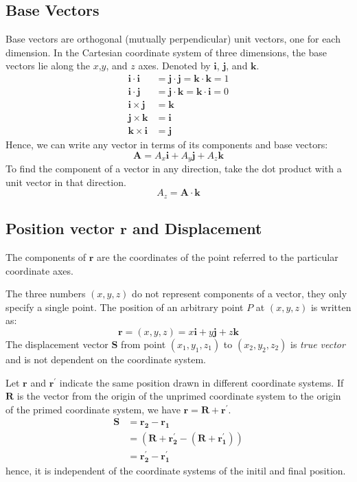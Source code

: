\documentclass{article}
\begin{document}
{\subsection{Base Vectors}
Base vectors are orthogonal (mutually perpendicular) unit vectors, one for each
dimension. In the Cartesian coordinate system of three dimensions, the base
vectors lie along the $x$,$y$, and $z$ axes. Denoted by $\textbf{i}$,
$\textbf{j}$, and $\textbf{k}$.
\begin{align*}
    \mathbf{i} \cdot \mathbf{i} &= \mathbf{j} \cdot \mathbf{j} = \mathbf{k} \cdot \mathbf{k} = 1 \\
    \mathbf{i} \cdot  \mathbf{j} &=  \mathbf{j} \cdot  \mathbf{k} =  \mathbf{k} \cdot  \mathbf{i} = 0 \\
    \mathbf{i} \times  \mathbf{j} &=  \mathbf{k} \\
    \mathbf{j} \times  \mathbf{k} &=  \mathbf{i} \\
    \mathbf{k} \times  \mathbf{i} &=  \mathbf{j}
\end{align*}
Hence, we can write any vector in terms of its components and base vectors:
\[ \mathbf{A} = A_x \mathbf{i}+A_y \mathbf{j}+A_z \mathbf{k}\]
To find the component of a vector in any direction, take the dot product
with a unit vector in that direction.
\[A_z = \mathbf{A} \cdot \mathbf{k}\]
\subsection{Position vector $\mathbf{r}$ and Displacement }
The components of $\mathbf{r}$ are the coordinates of the
point referred to the particular coordinate axes.

The three numbers $(x,y,z)$ do not represent components of a vector, they only
specify a single point. The position of an arbitrary point $P$ at $(x,y,z)$ is
written as:
\[\mathbf{r} = (x,y,z) = x\mathbf{i}+y\mathbf{j}+z\mathbf{k}\] The displacement
vector $\mathbf{S}$ from point $(x_1,y_1,z_1)$ to $(x_2,y_2,z_2)$ is \emph{true
vector} and is not dependent on the coordinate system.

Let $\mathbf{r}$ and $\mathbf{r^{\prime}}$ indicate the same position drawn in
different coordinate systems. If $\mathbf{R}$ is the vector from the origin of
the unprimed coordinate system to the origin of the primed coordinate system, we
have $\mathbf{r} = \mathbf{R}+\mathbf{r^{\prime}}$. 
\begin{align*}
    \mathbf{S} &= \mathbf{r_2} - \mathbf{r_1} \\
    &= (\mathbf{R}+ \mathbf{r_2^{\prime}}-(\mathbf{R}+\mathbf{r_1^{\prime}})) \\
    &= \mathbf{r_2^{\prime} - \mathbf{r_1^{\prime}}}
\end{align*}
hence, it is independent of the coordinate systems of the initil and final position.

}
\end{document}
